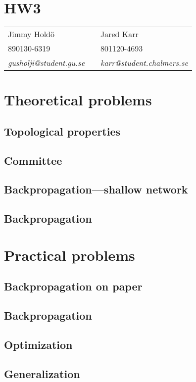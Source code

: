 \documentclass[a4paper,11pt]{article}
\begin{document}
\section*{HW3}

\begin{tabular*}{0.9\textwidth}{@{\extracolsep{\fill} } lll}
Jimmy Hold\"{o} & & Jared Karr\\
890130-6319 & & 801120-4693\\
\it{gusholji@student.gu.se} & & \it{karr@student.chalmers.se}\\
\end{tabular*}

\section{Theoretical problems}
\subsection{Topological properties}

\subsection{Committee}

\subsection{Backpropagation---shallow network}

\subsection{Backpropagation}

\section{Practical problems}
\subsection{Backpropagation on paper}

\subsection{Backpropagation}

\subsection{Optimization}

\subsection{Generalization}
\end{document}
